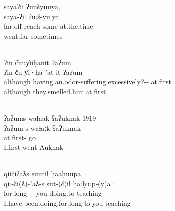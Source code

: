 \begin{exe}
  \ex\label{ex:3.17}
  \begin{xlist}

    \ex\label{ex:3.17a}
    \glllll sayaʔii       ʔuušyuuya,\\
            saya‑ʔiː      ʔuːš‑yuːya\\
            far.off‑reach some‑at.the.time\\
            went.far      sometimes\\
                 \\

    \ex\label{ex:3.17b}
    \glllll ʔin      č̓uuy̓iiḥanit                                               ʔaʔum.\\
            ʔin      č̓u‑y̓i·ḥa‑ʼat‑it                                            ʔaʔum\\
            although having.an.odor‑suffering.excessively?‑‑ at.first\\
            although they.smelled.him                                          at.first\\
            { }                                                       \\

    \ex\label{ex:3.17c}
    \glllll ʔaʔums            waɬaak    ʕaʔuknak  1919\\
            ʔaʔum‑s           waɬaːk    ʕaʔuknak  { }\\
            at.first‑ go         { }\\
            I.first           went      Auknak    { }\\
                        { }\\

    \ex\label{ex:3.17d}
    \glllll qiičiʔaƛs                          suutiɬ       ḥaaḥuupa\\
            qiː‑či(ƛ)‑ʼaƛ‑s                     sut‑(č)iɬ    ḥaːḥuːp‑(y)a·\\
            for.long‑‑‑ you‑doing.to teaching‑\\
            I.have.been.doing.for.long         to.you       teaching\\
                                          \\

  \end{xlist}
\end{exe}

